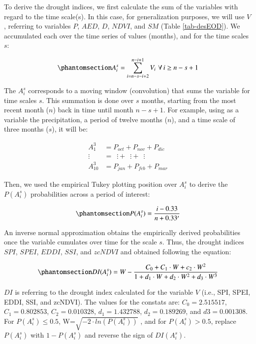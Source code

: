 \documentclass[
  authoryear,
  preprint,
  3p,
  onecolumn]{elsarticle}
\begin{document}
To derive the drought indices, we first calculate the sum of the
variables with regard to the time scale(s). In this case, for
generalization purposes, we will use \(V\), referring to variables
\(P\), \(AED\), \(D\), \(NDVI\), and \(SM\) (Table \ref{tab-desEOD}). We
accumulated each over the time series of values (months), and for the
time scales \(s\):

\begin{equation}\phantomsection\label{eq-sumvar}{A^s_i = \sum_{i=n-s-i+2}^{n-i+1} V_i\,\, \forall\, i\geq n-s+1  }\end{equation}

The \(A^s_i\) corresponds to a moving window (convolution) that sums the
variable for time scales \(s\). This summation is done over \(s\)
months, starting from the most recent month (\(n\)) back in time until
month \(n-s+1\). For example, using as a variable the precipitation, a
period of twelve months (\(n\)), and a time scale of three months
(\(s\)), it will be:

\[
\begin{split}
A^3_1 &= P_{oct} +P_{nov} +P_{dic} \\
\vdots\,\,\, &= \,\,\,\vdots + \,\,\,\vdots + \,\,\,\vdots \\
A^3_{10} &= P_{jan}+P_{feb} +P_{mar}
\end{split}
\]

Then, we used the empirical Tukey plotting position \citep{Wilks2011}
over \(A_i^s\) to derive the \(P(A_i^s)\) probabilities across a period
of interest:

\begin{equation}\phantomsection\label{eq-probPai}{P(A^s_i) = \frac{i-0.33}{n+0.33'}}\end{equation}

An inverse normal approximation \citep{Abramowitz1968} obtains the
empirically derived probabilities once the variable cumulates over time
for the scale \(s\). Thus, the drought indices \(SPI\), \(SPEI\),
\(EDDI\), \(SSI\), and \(zcNDVI\) and obtained following the equation:

\begin{equation}\phantomsection\label{eq-DI}{DI(A^s_i) = W - \frac{C_0+C_1\cdot W + c_2 \cdot W^2}{1+d_1\cdot W +d_2\cdot W^2 +d_3\cdot W^3}}\end{equation}

\(DI\) is referring to the drought index calculated for the variable
\(V\) (i.e., SPI, SPEI, EDDI, SSI, and zcNDVI). The values for the
constats are: \(C_0 = 2.515517\), \(C_1 = 0.802853\),
\(C_2 = 0.010328\), \(d_1 = 1.432788\), \(d_2 = 0.189269\), and
\(d3 = 0.001308\). For \(P(A^s_i) \leq 0.5\),
W=\(\sqrt{-2\cdot ln(P(A^s_i))}\) , and for \(P(A^s_i) > 0.5\), replace
\(P(A^s_i)\) with \(1-P(A^s_i)\) and reverse the sign of \(DI(A^s_i)\).
\end{document}
